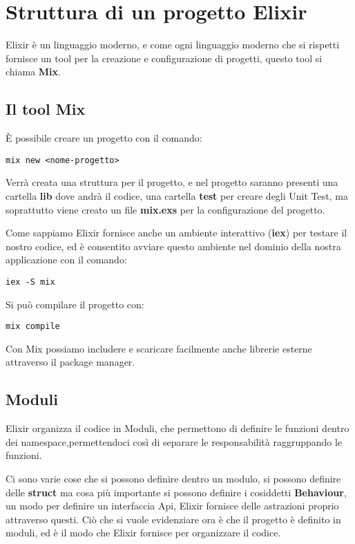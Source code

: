 \section{Struttura di un progetto Elixir}

Elixir è un linguaggio moderno, e come ogni linguaggio moderno che
si rispetti fornisce un tool per la creazione e configurazione di
progetti, questo tool si chiama \textbf{Mix}.

\subsection{Il tool Mix}
È possibile creare un progetto con il comando:

\begin{lstlisting}[language=none]
mix new <nome-progetto>
\end{lstlisting}

Verrà creata una struttura per il progetto, e nel progetto saranno
presenti una cartella \textbf{lib} dove andrà il codice,
una cartella \textbf{test} per creare degli Unit Test, ma soprattutto
viene creato un file \textbf{mix.exs} per la configurazione del progetto.

Come sappiamo Elixir fornisce anche un ambiente interattivo (\textbf{iex}) per
testare il nostro codice, ed è consentito avviare questo ambiente nel
dominio della nostra applicazione con il comando:

\begin{lstlisting}[language=none]
iex -S mix 
\end{lstlisting}
Si può compilare il progetto con:
\begin{lstlisting}[language=none]
mix compile
\end{lstlisting}

Con Mix possiamo includere e scaricare facilmente anche librerie esterne attraverso
il package manager.\cite{HexDocs99:online}

\subsection{Moduli}
Elixir organizza il codice in Moduli, che permettono di definire
le funzioni dentro dei namespace,permettendoci così di separare
le responsabilità raggruppando le funzioni.

Ci sono varie cose che si possono definire dentro un modulo,
si possono definire delle \textbf{struct}
ma cosa più importante si possono definire i cosiddetti 
\textbf{Behaviour}, un modo per definire un interfaccia Api,
Elixir fornisce delle astrazioni proprio attraverso questi.
Ciò che si vuole evidenziare ora è che il progetto è definito
in moduli, ed è il modo che Elixir fornisce per organizzare il
codice.




